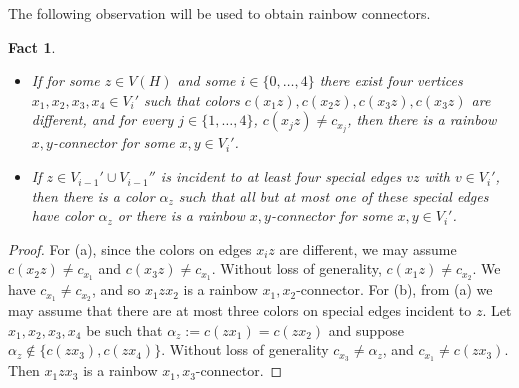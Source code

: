 \documentclass{article}
\newtheorem{fact}[theorem]{Fact}
\begin{document}
The following observation will be used to obtain rainbow connectors.

 \begin{fact}\label{ext-fact4.5}
 \begin{itemize}
 \item[(a)] 
 If for some $z\in V(H)$ and some $i\in \{0,\dots, 4\}$ there exist four vertices $x_1, x_2, x_3, x_4\in V_i'$ such that colors $c(x_1z), c(x_2z), c(x_3z), c(x_3z)$ are different, and for every $j\in \{1, \dots, 4\}$, $c(x_jz)\neq c_{x_j}$, then there is a rainbow $x,y$-connector for some $x,y\in V_i'$.
\item[(b)] If $z\in V_{i-1}'\cup V_{i-1}''$ is incident to at least four special edges $vz$ with $v\in V_i'$, then there is a color $\alpha_z$ such that all but at most one of these special edges have color $\alpha_z$ or there is a rainbow $x,y$-connector for some $x, y\in V_i'$.
\end{itemize}
 \end{fact}
 \begin{proof}
 For (a),  since the colors on edges $x_iz$ are different, we may assume $c(x_2z)\neq c_{x_1}$ and $c(x_3z)\neq c_{x_1}$. Without loss of generality, $c(x_1z)\neq c_{x_2}.$ We have $c_{x_1}\neq c_{x_2}$, and so $x_1zx_2$ is a rainbow $x_1,x_2$-connector.
 For (b), from (a) we may assume that there are at most three colors on special edges incident to $z$. Let $x_1, x_2, x_3, x_4$ be such that $\alpha_z:=c(zx_1)=c(zx_2)$ and suppose $\alpha_z \notin \{c(zx_3), c(zx_4)\}.$ Without loss of generality $c_{x_3}\neq \alpha_z$, and $c_{x_1}\neq c(zx_3).$ Then $x_1zx_3$ is a rainbow $x_1,x_3$-connector.
\end{proof} 
\end{document}
